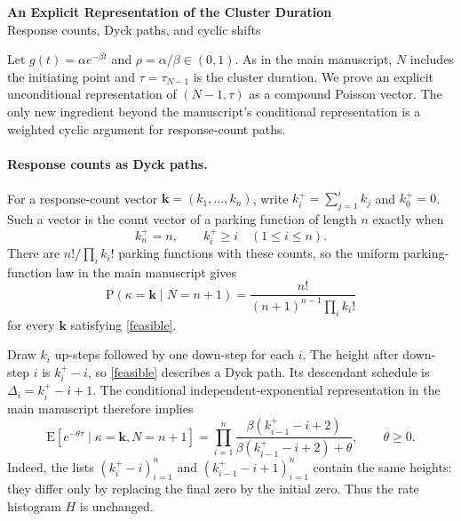 \documentclass[11pt]{article}
\newcommand{\E}[1]{\mathrm{E}\left[#1\right]}
\newcommand{\PP}[1]{\mathrm{P}\left(#1\right)}
\begin{document}
\begin{center}
{\large\bfseries An Explicit Representation of the Cluster Duration}\\[3pt]
{Response counts, Dyck paths, and cyclic shifts}
\end{center}

Let $g(t)=\alpha e^{-\beta t}$ and $\rho=\alpha/\beta\in(0,1)$.
As in the main manuscript, $N$ includes the initiating point and
$\tau=\tau_{N-1}$ is the cluster duration. We prove an explicit
unconditional representation of $(N-1,\tau)$ as a compound Poisson
vector. The only new ingredient beyond the manuscript's conditional
representation is a weighted cyclic argument for response-count paths.

\paragraph{Response counts as Dyck paths.}
For a response-count vector $\mathbf k=(k_1,\ldots,k_n)$, write
$k_i^+=\sum_{j=1}^i k_j$ and $k_0^+=0$. Such a vector is the count
vector of a parking function of length $n$ exactly when
\begin{equation}\label{feasible}
k_n^+=n,\qquad k_i^+\ge i\quad(1\le i\le n).
\end{equation}
There are $n!/\prod_i k_i!$ parking functions with these counts, so
the uniform parking-function law in the main manuscript gives
\begin{equation}\label{countLaw}
\PP{\kappa=\mathbf k\mid N=n+1}
=\frac{n!}{(n+1)^{n-1}\prod_i k_i!}
\end{equation}
for every $\mathbf k$ satisfying \eqref{feasible}.

Draw $k_i$ up-steps followed by one down-step for each $i$. The height
after down-step $i$ is $k_i^+-i$, so \eqref{feasible} describes a Dyck
path. Its descendant schedule is $\Delta_i=k_i^+-i+1$. The conditional
independent-exponential representation in the main manuscript therefore
implies
\begin{equation}\label{conditionalLST}
\E{e^{-\theta\tau}\mid\kappa=\mathbf k,N=n+1}
=\prod_{i=1}^n
\frac{\beta(k_{i-1}^+-i+2)}{\beta(k_{i-1}^+-i+2)+\theta},
\qquad\theta\ge0.
\end{equation}
Indeed, the lists $(k_i^+-i)_{i=1}^n$ and
$(k_{i-1}^+-i+1)_{i=1}^n$ contain the same heights: they differ only
by replacing the final zero by the initial zero. Thus the rate
histogram $H$ is unchanged.
\end{document}
